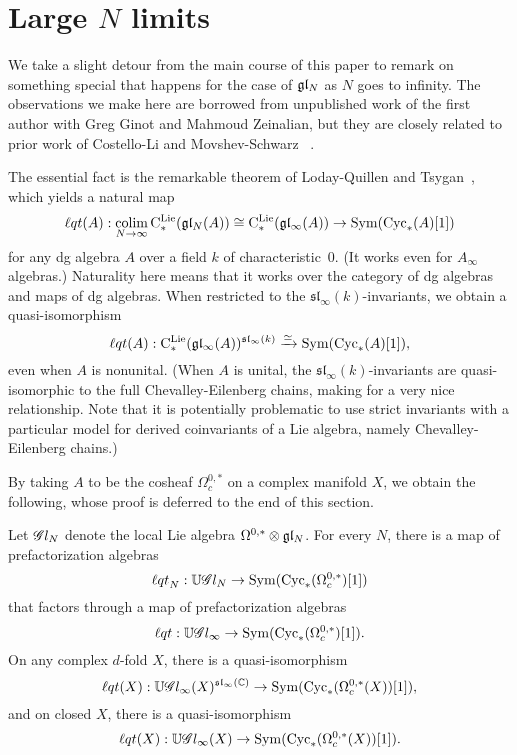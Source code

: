 \section{Large $N$ limits} \label{sec: largeN}


\def\cycls{{\rm Cyc}_*}
\def\lqt{{\ell q t}}
\def\colim{{\rm colim}}
\def\sl{\mathfrak{sl}}

We take a slight detour from the main course of this paper to remark on something special that happens for the case of $\mathfrak{g} \mathfrak{l}_N$ as $N$ goes to infinity.
The observations we make here are borrowed from unpublished work of the first author with Greg Ginot and Mahmoud Zeinalian,
but they are closely related to prior work of Costello-Li \cite{CLbcov2} and Movshev-Schwarz~\cite{} .

The essential fact is the remarkable theorem of Loday-Quillen \cite{LQ} and Tsygan~\cite{Tsy},
which yields a natural map 
\[
\lqt(A) : \underset{N \to \infty}{\colim} \, \cliels(\gl_N(A)) \cong \cliels(\gl_\infty(A)) \to \Sym(\cycls(A)[1])
\]
for any dg algebra $A$ over a field $k$ of characteristic~0.
(It works even for $A_\infty$ algebras.)
Naturality here means that it works over the category of dg algebras and maps of dg algebras.
When restricted to the $\sl_\infty(k)$-invariants, we obtain a quasi-isomorphism
\[
\lqt(A) :\cliels(\gl_\infty(A))^{\sl_\infty(k)} \xto{\simeq} \Sym(\cycls(A)[1]),
\]
even when $A$ is nonunital. 
(When $A$ is unital, the $\sl_\infty(k)$-invariants are quasi-isomorphic to the full Chevalley-Eilenberg chains,
making for a very nice relationship. 
Note that it is potentially problematic to use strict invariants with a particular model for derived coinvariants of a Lie algebra,
namely Chevalley-Eilenberg chains.)

By taking $A$ to be the cosheaf $\Omega^{0,*}_c$ on a complex manifold $X$,
we obtain the following, whose proof is deferred to the end of this section.

\begin{prop}
Let $\mathscr G l_N$ denote the local Lie algebra $\Omega^{0,*} \otimes \mathfrak{g} \mathfrak{l}_N$.
For every $N$, there is a map of prefactorization algebras
\[
\lqt_N: \UU \sG l_N \to \Sym(\cycls(\Omega^{0,*}_c)[1])
\]
that factors through a map of prefactorization algebras
\[
\lqt: \UU \sG l_\infty \to \Sym(\cycls(\Omega^{0,*}_c)[1]).
\]
On any complex $d$-fold $X$, there is a quasi-isomorphism
\[
\lqt(X): \UU \sG l_\infty(X)^{\sl_\infty(\CC)} \to \Sym(\cycls(\Omega^{0,*}_c(X))[1]),
\]
and on closed $X$, there is a quasi-isomorphism
\[
\lqt(X): \UU \sG l_\infty(X) \to \Sym(\cycls(\Omega^{0,*}_c(X))[1]).
\]
\end{prop}

